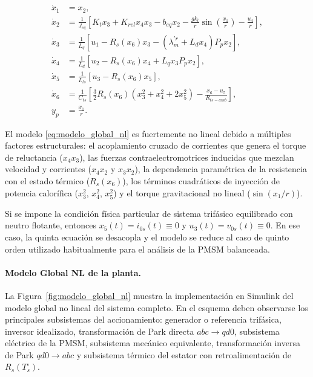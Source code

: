 \documentclass[10pt,a4paper]{article}
\begin{document}
\begin{equation}
	\boxed{
		\begin{aligned}
			\dot{x}_1 &= x_2,\\[1mm]
			\dot{x}_2 &= \frac{1}{J_{eq}}\left[K_t x_3+K_{rel}x_4x_3-b_{eq}x_2-\frac{gk_l}{r}\sin\left(\frac{x_1}{r}\right)-\frac{u_4}{r}\right],\\[1mm]
			\dot{x}_3 &= \frac{1}{L_q}\left[u_1-R_s(x_6)x_3-\left(\lambda_m^{\prime r}+L_d x_4\right)P_p x_2\right],\\[1mm]
			\dot{x}_4 &= \frac{1}{L_d}\left[u_2-R_s(x_6)x_4+L_q x_3 P_p x_2\right],\\[1mm]
			\dot{x}_5 &= \frac{1}{L_{ls}}\left[u_3-R_s(x_6)x_5\right],\\[1mm]
			\dot{x}_6 &= \frac{1}{C_{ts}}\left[\frac{3}{2}R_s(x_6)\left(x_3^2+x_4^2+2x_5^2\right)-\frac{x_6-u_5}{R_{ts-amb}}\right],\\[2mm]
			y_p &= \frac{x_1}{r}.
		\end{aligned}
	}
	\label{eq:modelo_global_nl}
\end{equation}

El modelo \eqref{eq:modelo_global_nl} es fuertemente no lineal debido a múltiples factores estructurales: el acoplamiento cruzado de corrientes que genera el torque de reluctancia ($x_4x_3$), las fuerzas contraelectromotrices inducidas que mezclan velocidad y corrientes ($x_4x_2$ y $x_3x_2$), la dependencia paramétrica de la resistencia con el estado térmico ($R_s(x_6)$), los términos cuadráticos de inyección de potencia calorífica ($x_3^2$, $x_4^2$, $x_5^2$) y el torque gravitacional no lineal ($\sin(x_1/r)$).

Si se impone la condición física particular de sistema trifásico equilibrado con neutro flotante, entonces $x_5(t)=i_{0s}(t)\equiv 0$ y $u_3(t)=v_{0s}(t)\equiv 0$. En ese caso, la quinta ecuación se desacopla y el modelo se reduce al caso de quinto orden utilizado habitualmente para el análisis de la PMSM balanceada.

\paragraph{Modelo Global NL de la planta.}
La Figura~\ref{fig:modelo_global_nl} muestra la implementación en Simulink del modelo global no lineal del sistema completo. En el esquema deben observarse los principales subsistemas del accionamiento: generador o referencia trifásica, inversor idealizado, transformación de Park directa $abc\rightarrow qd0$, subsistema eléctrico de la PMSM, subsistema mecánico equivalente, transformación inversa de Park $qd0\rightarrow abc$ y subsistema térmico del estator con retroalimentación de $R_s(T_s^{\circ})$.
\end{document}
